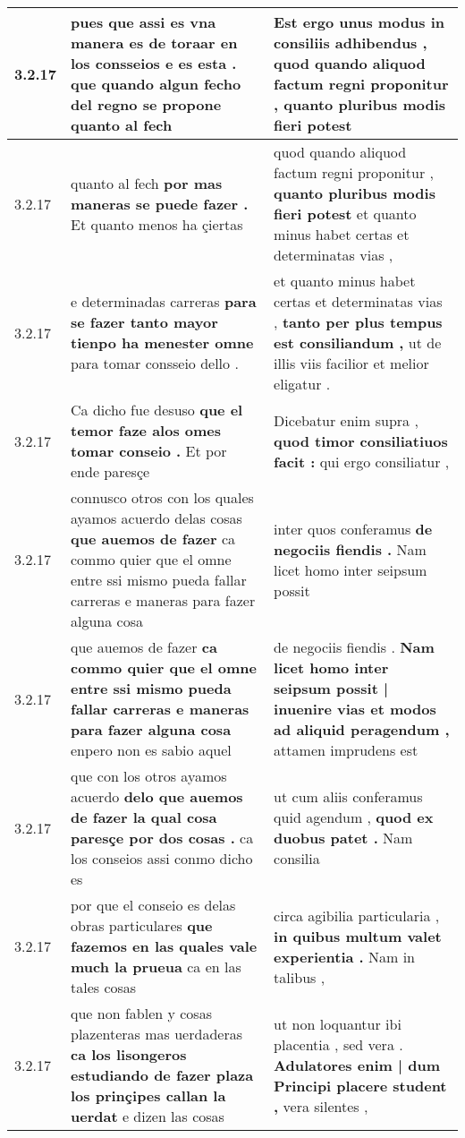 \begin{tabular}{|p{1cm}|p{6.5cm}|p{6.5cm}|}
3.2.17 & pues que assi es vna manera es de toraar en los consseios e es esta . \textbf{ que quando algun fecho del regno se propone } quanto al fech & Est ergo unus modus in consiliis adhibendus , \textbf{ quod quando aliquod factum regni proponitur , } quanto pluribus modis fieri potest \\\hline
3.2.17 & quanto al fech \textbf{ por mas maneras se puede fazer . } Et quanto menos ha çiertas & quod quando aliquod factum regni proponitur , \textbf{ quanto pluribus modis fieri potest } et quanto minus habet certas et determinatas vias , \\\hline
3.2.17 & e determinadas carreras \textbf{ para se fazer tanto mayor tienpo ha menester omne } para tomar consseio dello . & et quanto minus habet certas et determinatas vias , \textbf{ tanto per plus tempus est consiliandum , } ut de illis viis facilior et melior eligatur . \\\hline
3.2.17 & Ca dicho fue desuso \textbf{ que el temor faze alos omes tomar conseio . } Et por ende paresçe & Dicebatur enim supra , \textbf{ quod timor consiliatiuos facit : } qui ergo consiliatur , \\\hline
3.2.17 & connusco otros con los quales ayamos acuerdo delas cosas \textbf{ que auemos de fazer } ca commo quier que el omne entre ssi mismo pueda fallar carreras e maneras para fazer alguna cosa & inter quos conferamus \textbf{ de negociis fiendis . } Nam licet homo inter seipsum possit \\\hline
3.2.17 & que auemos de fazer \textbf{ ca commo quier que el omne entre ssi mismo pueda fallar carreras e maneras para fazer alguna cosa } enpero non es sabio aquel & de negociis fiendis . \textbf{ Nam licet homo inter seipsum possit | inuenire vias et modos ad aliquid peragendum , } attamen imprudens est \\\hline
3.2.17 & que con los otros ayamos acuerdo \textbf{ delo que auemos de fazer la qual cosa paresçe por dos cosas . } ca los conseios assi conmo dicho es & ut cum aliis conferamus quid agendum , \textbf{ quod ex duobus patet . } Nam consilia \\\hline
3.2.17 & por que el conseio es delas obras particulares \textbf{ que fazemos en las quales vale much la prueua } ca en las tales cosas & circa agibilia particularia , \textbf{ in quibus multum valet experientia . } Nam in talibus , \\\hline
3.2.17 & que non fablen y cosas plazenteras mas uerdaderas \textbf{ ca los lisongeros estudiando de fazer plaza los prinçipes callan la uerdat } e dizen las cosas & ut non loquantur ibi placentia , sed vera . \textbf{ Adulatores enim | dum Principi placere student , } vera silentes , \\\hline

\end{tabular}
